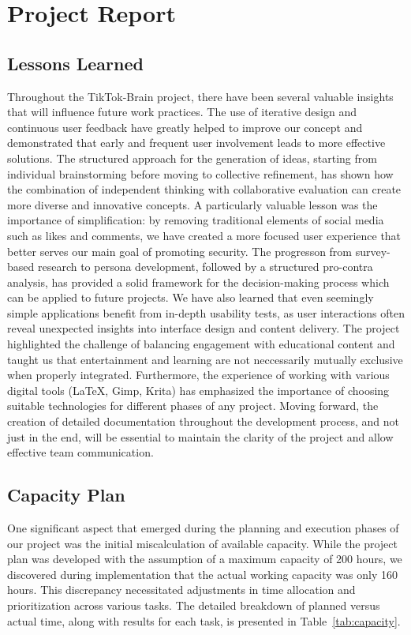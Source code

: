 \documentclass{article}
\begin{document}
\section{Project Report}
\subsection{Lessons Learned}
Throughout the TikTok-Brain project, there have been several valuable insights that will influence future work practices.
The use of iterative design and continuous user feedback have greatly helped to improve our concept
and demonstrated that early and frequent user involvement leads to more effective solutions.
The structured approach for the generation of ideas,
starting from individual brainstorming before moving to collective refinement,
has shown how the combination of independent thinking with collaborative evaluation
can create more diverse and innovative concepts.
A particularly valuable lesson was the importance of simplification:
by removing traditional elements of social media such as likes and comments,
we have created a more focused user experience that better serves our main goal of promoting security.
The progresson from survey-based research to persona development, followed by a structured pro-contra analysis,
has provided a solid framework for the decision-making process which can be applied to future projects.
We have also learned that even seemingly simple applications benefit from in-depth usability tests,
as user interactions often reveal unexpected insights into interface design and content delivery.
The project highlighted the challenge of balancing engagement with educational content
and taught us that entertainment and learning are not neccessarily mutually exclusive when properly integrated.
Furthermore, the experience of working with various digital tools (LaTeX, Gimp, Krita)
has emphasized the importance of choosing suitable technologies for different phases of any project.
Moving forward, the creation of detailed documentation throughout the development process,
and not just in the end, will be essential to maintain the clarity of the project and allow effective team communication.

\subsection{Capacity Plan}
One significant aspect that emerged during the planning and execution phases of our project
was the initial miscalculation of available capacity.
While the project plan was developed with the assumption of a maximum capacity of 200 hours,
we discovered during implementation that the actual working capacity was only 160 hours.
This discrepancy necessitated adjustments in time allocation and prioritization across various tasks.
The detailed breakdown of planned versus actual time, along with results for each task, is presented in Table~\ref{tab:capacity}.
\end{document}
